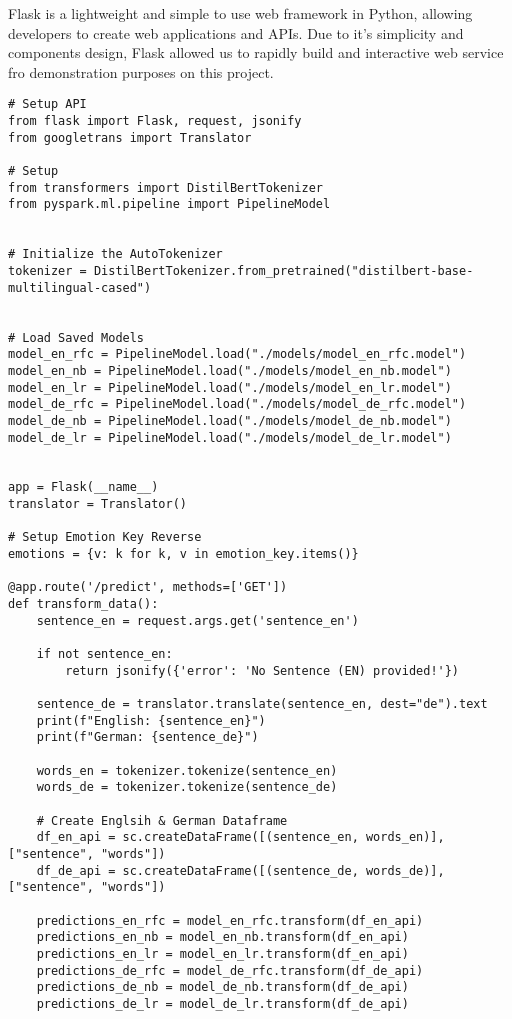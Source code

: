 Flask is a lightweight and simple to use web framework in Python, allowing developers to create web applications and APIs. Due to it's simplicity and components design, Flask allowed us to rapidly build and interactive web service fro demonstration purposes on this project.
\begin{verbatim}
# Setup API 
from flask import Flask, request, jsonify
from googletrans import Translator

# Setup
from transformers import DistilBertTokenizer
from pyspark.ml.pipeline import PipelineModel


# Initialize the AutoTokenizer
tokenizer = DistilBertTokenizer.from_pretrained("distilbert-base-multilingual-cased")


# Load Saved Models
model_en_rfc = PipelineModel.load("./models/model_en_rfc.model")
model_en_nb = PipelineModel.load("./models/model_en_nb.model")
model_en_lr = PipelineModel.load("./models/model_en_lr.model")
model_de_rfc = PipelineModel.load("./models/model_de_rfc.model")
model_de_nb = PipelineModel.load("./models/model_de_nb.model")
model_de_lr = PipelineModel.load("./models/model_de_lr.model")


app = Flask(__name__)
translator = Translator()

# Setup Emotion Key Reverse
emotions = {v: k for k, v in emotion_key.items()}

@app.route('/predict', methods=['GET'])
def transform_data():
    sentence_en = request.args.get('sentence_en')
    
    if not sentence_en:
        return jsonify({'error': 'No Sentence (EN) provided!'})
    
    sentence_de = translator.translate(sentence_en, dest="de").text
    print(f"English: {sentence_en}")
    print(f"German: {sentence_de}")
    
    words_en = tokenizer.tokenize(sentence_en)
    words_de = tokenizer.tokenize(sentence_de)

    # Create Englsih & German Dataframe
    df_en_api = sc.createDataFrame([(sentence_en, words_en)], ["sentence", "words"])
    df_de_api = sc.createDataFrame([(sentence_de, words_de)], ["sentence", "words"])
    
    predictions_en_rfc = model_en_rfc.transform(df_en_api)
    predictions_en_nb = model_en_nb.transform(df_en_api)
    predictions_en_lr = model_en_lr.transform(df_en_api)
    predictions_de_rfc = model_de_rfc.transform(df_de_api)
    predictions_de_nb = model_de_nb.transform(df_de_api)
    predictions_de_lr = model_de_lr.transform(df_de_api)
    

\end{verbatim}
